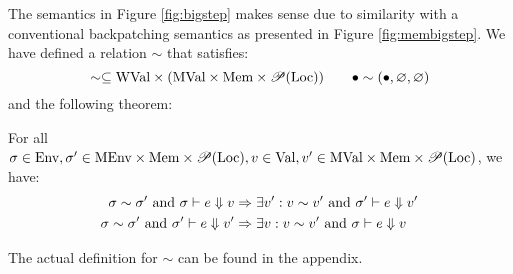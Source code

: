 The semantics in Figure \ref{fig:bigstep} makes sense due to similarity with a conventional backpatching semantics as presented in Figure \ref{fig:membigstep}.
We have defined a relation $\sim$ that satisfies:
\[\sim\subseteq\text{WVal}\times(\text{MVal}\times\text{Mem}\times\mathscr{P}(\text{Loc}))\qquad\bullet\sim(\bullet,\varnothing,\varnothing)\]
and the following theorem:
\begin{theorem}\normalfont
  For all $\sigma\in\text{Env},\sigma'\in\text{MEnv}\times\text{Mem}\times\mathscr{P}(\text{Loc}),v\in\text{Val},v'\in\text{MVal}\times\text{Mem}\times\mathscr{P}(\text{Loc})$, we have:
  \begin{align*}
    \sigma\sim\sigma'\text{ and }{\sigma}\vdash{e}\Downarrow{v}   & \Rightarrow\exists v':v\sim v'\text{ and }{\sigma'}\vdash{e}\Downarrow{v'} \\
    \sigma\sim\sigma'\text{ and }{\sigma'}\vdash{e}\Downarrow{v'} & \Rightarrow\exists v:v\sim v'\text{ and }{\sigma}\vdash{e}\Downarrow{v}
  \end{align*}
\end{theorem}
The actual definition for $\sim$ can be found in the appendix.
